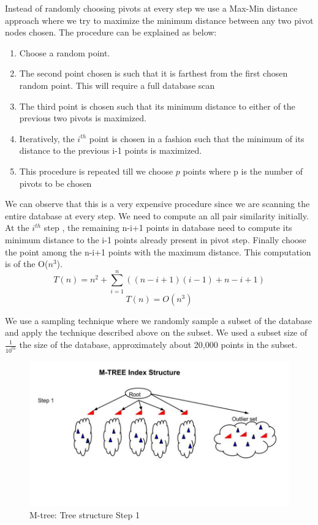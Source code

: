 Instead of randomly choosing pivots at every step we use a Max-Min distance approach where we try to maximize the minimum distance between any two pivot nodes chosen. The procedure can be explained as below:

\begin{enumerate}
	\item Choose a random point.
	\item The second point chosen is such that it is farthest from the first chosen random point. This will require a full database scan
	\item The third point is chosen such that its minimum distance to either of the previous two pivots is maximized.
	\item Iteratively, the $i^{th}$ point is chosen in a fashion such that the minimum of its distance to the previous i-1 points is maximized.
	\item This procedure is repeated till we choose $p$ points where p is the number of pivots to be chosen	\\

\end{enumerate} 

We can observe that this is a very expensive procedure since we are scanning the entire database at every step. We need to compute an all pair similarity initially. At the $i^{th}$ step , the remaining n-i+1 points in  database need to compute its minimum distance to the i-1 points already present in pivot step. Finally choose the point among the n-i+1 points with the maximum distance. This computation is of the O($n^3$).
	\[T(n)=  n^2 + \sum \limits_{i=1}^{n}( (n-i+1)(i-1)  + n-i+1) \]
	\[T(n)=O(n^3)\]

We use a sampling technique where we randomly sample a subset of the database and apply the technique described above on the subset. We used a subset size of $\frac{1}{10^{th}}$ the size of the database, approximately about 20,000 points in the subset.


\begin{figure}[ht!]	
\centering
\includegraphics[width=1 \columnwidth]{img/image0d.jpg}
\caption{M-tree: Tree structure Step 1}
\label{fig: step1}
\end{figure}


